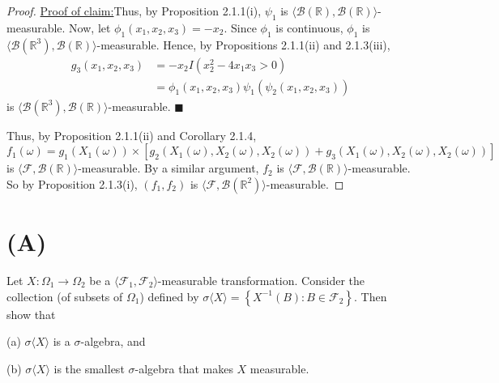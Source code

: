 \documentclass[12pt]{article}
\newenvironment{claimproof}[1]{\par\noindent\underline{Proof of claim:}\space#1}{\hfill $\blacksquare$}
\begin{document}
\begin{proof}
\begin{claimproof}
Thus, by Proposition 2.1.1(i), $\psi_{1}$ is $\langle\mathcal{B}(\mathbb{R}), \mathcal{B}(\mathbb{R})\rangle$-measurable. Now, let $\phi_{1}(x_1, x_2, x_3) = -x_2$. 
Since $\phi_1$ is continuous, $\phi_1$ is $\langle\mathcal{B}(\mathbb{R}^{3}), \mathcal{B}(\mathbb{R})\rangle$-measurable. Hence, by Propositions
2.1.1(ii) and 2.1.3(iii),
\begin{align*}
g_{3}(x_1, x_2, x_3) & = -x_2 I(x_2^2 - 4x_1 x_3 > 0) \\
& = \phi_1(x_1,x_2,x_3)\psi_{1}(\psi_{2}(x_1,x_2,x_3))
\end{align*}
is $\langle\mathcal{B}(\mathbb{R}^{3}), \mathcal{B}(\mathbb{R})\rangle$-measurable.
\end{claimproof}

Thus, by Proposition 2.1.1(ii) and Corollary 2.1.4, 
\[ f_{1}(\omega) = g_{1}(X_{1}(\omega))\times \left[ g_{2}\left( X_{1}(\omega), X_{2}(\omega), X_{2}(\omega) \right) + g_{3}\left( X_{1}(\omega),
X_{2}(\omega), X_{2}(\omega) \right) \right] \]
is $\langle\mathcal{F}, \mathcal{B}(\mathbb{R})\rangle$-measurable. By a similar argument, $f_{2}$ is $\langle\mathcal{F}, \mathcal{B}(\mathbb{R})\rangle$-measurable.
So by Proposition 2.1.3(i), $(f_{1}, f_{2})$ is $\langle\mathcal{F}, \mathcal{B}(\mathbb{R}^{2})\rangle$-measurable.
\end{proof}


\newpage
\section*{(A)}
Let $X : \Omega_{1} \rightarrow \Omega_{2}$ be a $\langle\mathcal{F}_{1}, \mathcal{F}_{2}\rangle$-measurable transformation. Consider the collection
(of subsets of $\Omega_{1}$) defined by $\sigma\langle X\rangle = \left\{ X^{-1}(B) : B \in \mathcal{F}_{2} \right\}$. Then show that 

(a) $\sigma\langle X\rangle$ is a $\sigma$-algebra, and 

(b) $\sigma\langle X\rangle$ is the smallest $\sigma$-algebra that makes $X$ measurable.
\end{document}
